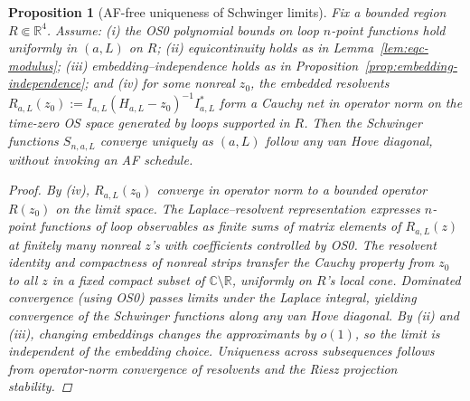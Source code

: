 \documentclass[11pt]{amsart}
\theoremstyle{plain}
\newtheorem{proposition}[theorem]{Proposition}
\theoremstyle{definition}
\theoremstyle{remark}
\begin{document}
\begin{proposition}[AF-free uniqueness of Schwinger limits]\label{prop:af-free-uniqueness}
Fix a bounded region $R\Subset\mathbb R^4$. Assume: (i) the OS0 polynomial bounds on loop $n$-point functions hold uniformly in $(a,L)$ on $R$; (ii) equicontinuity holds as in Lemma~\ref{lem:eqc-modulus}; (iii) embedding–independence holds as in Proposition~\ref{prop:embedding-independence}; and (iv) for some nonreal $z_0$, the embedded resolvents $R_{a,L}(z_0):=I_{a,L}(H_{a,L}-z_0)^{-1}I_{a,L}^*$ form a Cauchy net in operator norm on the time-zero OS space generated by loops supported in $R$. Then the Schwinger functions $S_{n,a,L}$ converge uniquely as $(a,L)$ follow any van Hove diagonal, without invoking an AF schedule.

\begin{proof}
By (iv), $R_{a,L}(z_0)$ converge in operator norm to a bounded operator $R(z_0)$ on the limit space. The Laplace–resolvent representation expresses $n$-point functions of loop observables as finite sums of matrix elements of $R_{a,L}(z)$ at finitely many nonreal $z$'s with coefficients controlled by OS0. The resolvent identity and compactness of nonreal strips transfer the Cauchy property from $z_0$ to all $z$ in a fixed compact subset of $\mathbb C\setminus\mathbb R$, uniformly on $R$'s local cone. Dominated convergence (using OS0) passes limits under the Laplace integral, yielding convergence of the Schwinger functions along any van Hove diagonal. By (ii) and (iii), changing embeddings changes the approximants by $o(1)$, so the limit is independent of the embedding choice. Uniqueness across subsequences follows from operator-norm convergence of resolvents and the Riesz projection stability.
\end{proof}
\end{proposition}
\end{document}
